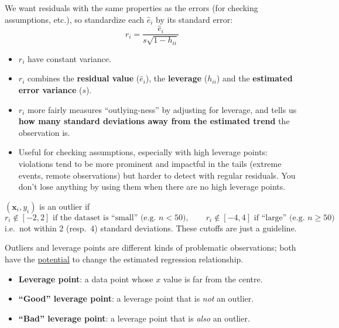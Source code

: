 \begin{definition}
    We want residuals with the same properties as the errors (for checking assumptions,
    etc.), so standardize each $\hat e_i$ by its standard error:
    \[\boxed{r_i=\frac{\hat e_i}{s\sqrt{1-h_{ii}}}}\]
    \begin{itemize}
        \item $r_i$ have constant variance.
        \item $r_i$ combines the \textbf{residual value} ($\hat e_i$), the \textbf{leverage}
        ($h_{ii}$) and the \textbf{estimated error variance} ($s$).
        \item $r_i$ more fairly measures ``outlying-ness'' by adjusting for leverage, and tells us
        \textbf{how many standard deviations away from the estimated trend} the observation is.
        \item Useful for checking assumptions, especially with high leverage points: violations
        tend to be more prominent and impactful in the tails (extreme events, remote
        observations) but harder to detect with regular residuals. You don't lose anything by
        using them when there are no high leverage points.
    \end{itemize}
\end{definition}

\begin{definition}
    $(\mathbf{x}_i,y_i)$ is an outlier if
    \[\boxed{r_i\notin[-2,2]\text{ if the dataset is ``small'' (e.g.\ }n<50\text{)},\qquad r_i\notin[-4,4]\text{ if ``large'' (e.g.\ }n\geq50\text{)}}\]
    i.e.\ not within 2 (resp.\ 4) standard deviations. These cutoffs are just a guideline.
\end{definition}

\begin{definition}
    Outliers and leverage points are different kinds of problematic observations; both have
    the \underline{potential} to change the estimated regression relationship.
    \begin{itemize}
        \item \textbf{Leverage point}: a data point whose $x$ value is far from the centre.
        \item \textbf{``Good'' leverage point}: a leverage point that is \emph{not} an outlier.
        \item \textbf{``Bad'' leverage point}: a leverage point that is \emph{also} an outlier.
    \end{itemize}
\end{definition}

